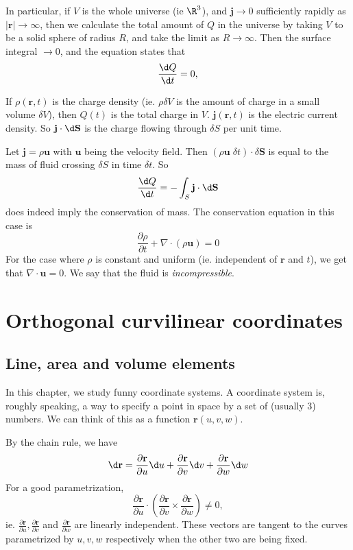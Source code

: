 \documentclass[a4paper]{article}
\begin{document}
In particular, if $V$ is the whole universe (ie $\R^3$), and $\mathbf{j}\to 0$ sufficiently rapidly as $|\mathbf{r}| \to \infty$, then we calculate the total amount of $Q$ in the universe by taking $V$ to be a solid sphere of radius $R$, and take the limit as $R\to \infty$. Then the surface integral $\to 0$, and the equation states that
\[
  \frac{\d Q}{\d t} = 0,
\]
\begin{eg}
  If $\rho(\mathbf{r}, t)$ is the charge density (ie. $\rho\delta V$ is the amount of charge in a small volume $\delta V$), then $Q(t)$ is the total charge in $V$. $\mathbf{j}(\mathbf{r}, t)$ is the electric current density. So $\mathbf{j}\cdot \d \mathbf{S}$ is the charge flowing through $\delta S$ per unit time.
\end{eg}

\begin{eg}
  Let $\mathbf{j} = \rho \mathbf{u}$ with $\mathbf{u}$ being the velocity field. Then $(\rho\mathbf{u}\; \delta t)\cdot \delta \mathbf{S}$ is equal to the mass of fluid crossing $\delta S$ in time $\delta t$. So
  \[
    \frac{\d Q}{\d t} = -\int_S \mathbf{j}\cdot \d \mathbf{S}
  \]
  does indeed imply the conservation of mass. The conservation equation in this case is
  \[
    \frac{\partial \rho}{\partial t} + \nabla\cdot (\rho \mathbf{u}) = 0
  \]
  For the case where $\rho$ is constant and uniform (ie. independent of $\mathbf{r}$ and $t$), we get that $\nabla\cdot \mathbf{u} = 0$. We say that the fluid is \emph{incompressible}.
\end{eg}

\section{Orthogonal curvilinear coordinates}
\subsection{Line, area and volume elements}
In this chapter, we study funny coordinate systems. A coordinate system is, roughly speaking, a way to specify a point in space by a set of (usually 3) numbers. We can think of this as a function $\mathbf{r}(u, v, w)$.

By the chain rule, we have
\[
  \d \mathbf{r} = \frac{\partial \mathbf{r}}{\partial u}\d u + \frac{\partial \mathbf{r}}{\partial v}\d v + \frac{\partial \mathbf{r}}{\partial w}\d w
\]
For a good parametrization,
\[
  \frac{\partial \mathbf{r}}{\partial u}\cdot \left(\frac{\partial \mathbf{r}}{\partial v}\times \frac{\partial \mathbf{r}}{\partial w}\right) \not = 0,
\]
ie. $\frac{\partial \mathbf{r}}{\partial u}, \frac{\partial \mathbf{r}}{\partial v}$ and $\frac{\partial \mathbf{r}}{\partial w}$ are linearly independent. These vectors are tangent to the curves parametrized by $u, v, w$ respectively when the other two are being fixed.
\end{document}
